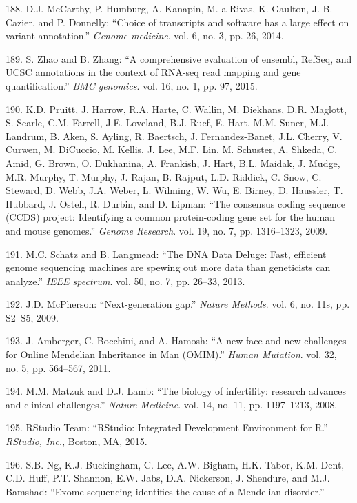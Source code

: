 \documentclass[12pt,a4paper,twoside]{ugathesis}
\theoremstyle{definition}
\theoremstyle{definition}
\theoremstyle{definition}
\theoremstyle{remark}
\begin{document}
\hypertarget{ref-McCarthy2014}{}
188. D.J. McCarthy, P. Humburg, A. Kanapin, M. a Rivas, K. Gaulton,
J.-B. Cazier, and P. Donnelly: ``Choice of transcripts and software has
a large effect on variant annotation.'' \emph{Genome medicine}. vol. 6,
no. 3, pp. 26, 2014.

\hypertarget{ref-Zhao2015}{}
189. S. Zhao and B. Zhang: ``A comprehensive evaluation of ensembl,
RefSeq, and UCSC annotations in the context of RNA-seq read mapping and
gene quantification.'' \emph{BMC genomics}. vol. 16, no. 1, pp. 97,
2015.

\hypertarget{ref-Pruitt2009}{}
190. K.D. Pruitt, J. Harrow, R.A. Harte, C. Wallin, M. Diekhans, D.R.
Maglott, S. Searle, C.M. Farrell, J.E. Loveland, B.J. Ruef, E. Hart,
M.M. Suner, M.J. Landrum, B. Aken, S. Ayling, R. Baertsch, J.
Fernandez-Banet, J.L. Cherry, V. Curwen, M. DiCuccio, M. Kellis, J. Lee,
M.F. Lin, M. Schuster, A. Shkeda, C. Amid, G. Brown, O. Dukhanina, A.
Frankish, J. Hart, B.L. Maidak, J. Mudge, M.R. Murphy, T. Murphy, J.
Rajan, B. Rajput, L.D. Riddick, C. Snow, C. Steward, D. Webb, J.A.
Weber, L. Wilming, W. Wu, E. Birney, D. Haussler, T. Hubbard, J. Ostell,
R. Durbin, and D. Lipman: ``The consensus coding sequence (CCDS)
project: Identifying a common protein-coding gene set for the human and
mouse genomes.'' \emph{Genome Research}. vol. 19, no. 7, pp. 1316--1323,
2009.

\hypertarget{ref-Schatz2013}{}
191. M.C. Schatz and B. Langmead: ``The DNA Data Deluge: Fast, efficient
genome sequencing machines are spewing out more data than geneticists
can analyze.'' \emph{IEEE spectrum}. vol. 50, no. 7, pp. 26--33, 2013.

\hypertarget{ref-McPherson2009}{}
192. J.D. McPherson: ``Next-generation gap.'' \emph{Nature Methods}.
vol. 6, no. 11s, pp. S2--S5, 2009.

\hypertarget{ref-Amberger2011}{}
193. J. Amberger, C. Bocchini, and A. Hamosh: ``A new face and new
challenges for Online Mendelian Inheritance in Man (OMIM).'' \emph{Human
Mutation}. vol. 32, no. 5, pp. 564--567, 2011.

\hypertarget{ref-Matzuk2008}{}
194. M.M. Matzuk and D.J. Lamb: ``The biology of infertility: research
advances and clinical challenges.'' \emph{Nature Medicine}. vol. 14, no.
11, pp. 1197--1213, 2008.

\hypertarget{ref-RStudioTeam2015}{}
195. RStudio Team: ``RStudio: Integrated Development Environment for
R.'' \emph{RStudio, Inc.}, Boston, MA, 2015.

\hypertarget{ref-Ng}{}
196. S.B. Ng, K.J. Buckingham, C. Lee, A.W. Bigham, H.K. Tabor, K.M.
Dent, C.D. Huff, P.T. Shannon, E.W. Jabs, D.A. Nickerson, J. Shendure,
and M.J. Bamshad: ``Exome sequencing identifies the cause of a Mendelian
disorder.''
\end{document}
